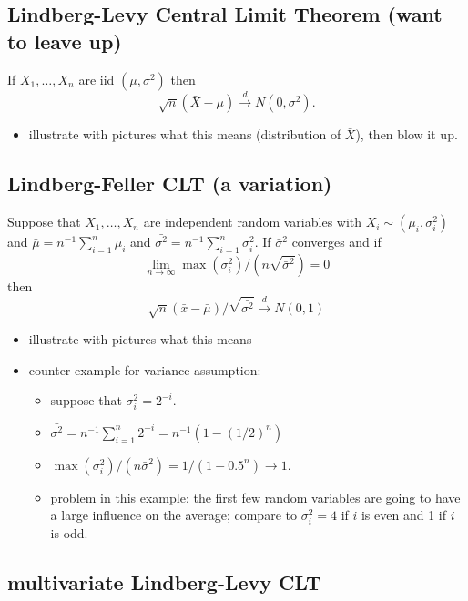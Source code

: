 \subsection{Lindberg-Levy Central Limit Theorem (want to leave up)}

     If $X_1,\dots,X_n$ are iid $(\mu, \sigma^2)$ then 
     \[\sqrt{n} (\bar X - \mu) \xrightarrow{d} N(0,\sigma^2).\]

\begin{itemize}
\item illustrate with pictures what this means (distribution of $\bar
       X$), then blow it up.
\end{itemize}

\subsection{Lindberg-Feller CLT (a variation)}

     Suppose that $X_1,\dots,X_n$ are independent random variables with
     $X_i \sim (\mu_i, \sigma_i^2)$ and $\bar \mu = n^{-1}\sum_{i=1}^n
     \mu_i$ and $\bar{\sigma^2} = n^{-1} \sum_{i=1}^n \sigma_i^2$.  If
     $\bar{\sigma}^2$ converges and if
     \[\lim_{n\to\infty} \max(\sigma_i^2)/(n\sqrt{\bar{\sigma}^2}) = 0\]
     then $$\sqrt{n}(\bar x - \bar \mu)/\sqrt{\bar{\sigma^2}} \xrightarrow{d} N(0,1)$$

\begin{itemize}
\item illustrate with pictures what this means
\item counter example for variance assumption:
\begin{itemize}
\item suppose that $\sigma_i^2 = 2^{-i}$.
\item $\bar{\sigma^2} = n^{-1} \sum_{i=1}^n 2^{-i} = n^{-1}(1 - (1/2)^n)$
\item $\max(\sigma_i^2)/(n\bar{\sigma}^2) = 1/(1-0.5^n) \to 1$.
\item problem in this example: the first few random variables are
         going to have a large influence on the average; compare to
         $\sigma_i^2 = 4$ if $i$ is even and 1 if $i$ is odd.
\end{itemize}
\end{itemize}

\subsection{multivariate Lindberg-Levy CLT}


